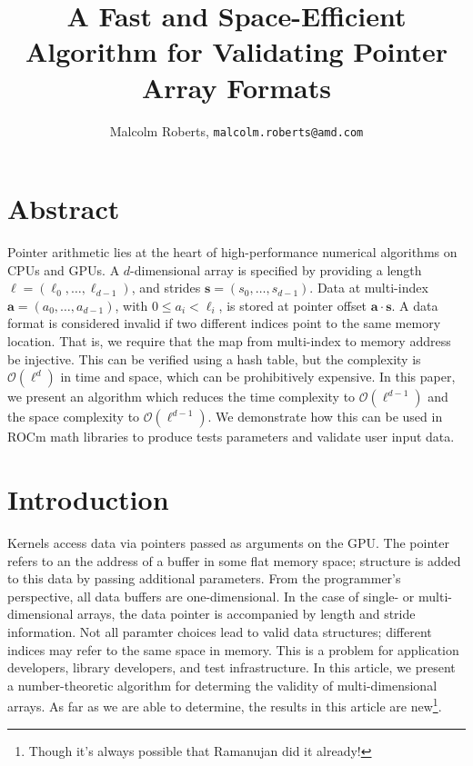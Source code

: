 \documentclass[twocolumn,10pt,notitlepage]{article}
\title{A Fast and Space-Efficient Algorithm for Validating Pointer Array Formats}
\date{}
\author{Malcolm Roberts, \texttt{malcolm.roberts@amd.com}}
\begin{document}
\maketitle


\section{Abstract}
Pointer arithmetic lies at the heart of high-performance numerical
algorithms on CPUs and GPUs.  A $d$-dimensional array is specified by
providing a length $\bm{\ell}=\left(\ell_0, \dots, \ell_{d-1}\right)$,
and strides $\bm{s}=\left(s_0, \dots, s_{d-1}\right)$. Data at
multi-index $\bm{a}=\left(a_0,\dots,a_{d-1} \right)$, with
$0\leq{}a_i<\ell_i$, is stored at pointer offset $\bm{a}\cdot\bm{s}$.
A data format is considered invalid if two different indices point to
the same memory location.  That is, we require that the map from
multi-index to memory address be injective.  This can be verified
using a hash table, but the complexity is
$\mathcal{O}\left(\ell^d\right)$ in time and space, which can be
prohibitively expensive.  In this paper, we present an algorithm which
reduces the time complexity to $\mathcal{O}\left(\ell^{d-1}\right)$
and the space complexity to $\mathcal{O}\left(\ell^{d-1}\right)$.  We
demonstrate how this can be used in ROCm math libraries to produce
tests parameters and validate user input data.


\section{Introduction}

Kernels access data via pointers passed as arguments on the GPU.  The
pointer refers to an the address of a buffer in some flat memory
space; structure is added to this data by passing additional
parameters.  From the programmer's perspective, all data buffers are
one-dimensional.  In the case of single- or multi-dimensional arrays,
the data pointer is accompanied by length and stride information.  Not
all paramter choices lead to valid data structures; different indices
may refer to the same space in memory.  This is a problem for
application developers, library developers, and test infrastructure.
In this article, we present a number-theoretic algorithm for determing
the validity of multi-dimensional arrays.  As far as we are able to
determine, the results in this article are new\footnote{Though it's
  always possible that Ramanujan did it already!}.
\end{document}
